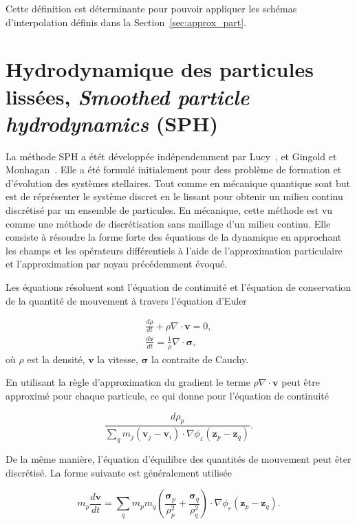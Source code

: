 Cette définition est déterminante pour pouvoir appliquer les schémas d'interpolation définis dans la Section~\ref{sec:approx_part}.

\section{Hydrodynamique des particules lissées, \textit{Smoothed particle hydrodynamics} (SPH)}

La méthode SPH a étét développée indépendemment par Lucy~\cite{lucy_1977}, et Gingold et Monhagan~\cite{gingold_monaghan_sph_1977}. Elle a été formulé initialement pour dess problème de formation et d'évolution des systèmes stellaires. Tout comme en mécanique quantique sont but est de réprésenter le système discret en le lissant pour obtenir un milieu continu discrétisé par un ensemble de particules. En mécanique, cette méthode est vu comme une méthode de discrétisation sans maillage d'un milieu continu.
Elle consiste à résoudre la forme forte des équations de la dynamique en approchant les champs et les opérateurs différentiels à l'aide de l'approximation particulaire et l'approximation par noyau précédemment évoqué.

Les équations résoluent sont l'équation de continuité et l'équation de conservation de la quantité de mouvement à travers l'équation d'Euler

\begin{eqnarray*}
    \frac{d\rho}{dt} + \rho \nabla \cdot \bm{v} = 0, \\
    \frac{d\bm v}{dt} = \frac1\rho \nabla \cdot \bm \sigma,
\end{eqnarray*}où $\rho$ est la densité, $\bm v$ la vitesse, $\bm \sigma$ la contraite de Cauchy.

En utilisant la règle d'approximation du gradient le terme $\rho \nabla \cdot \bm{v}$ peut être approximé pour chaque particule, ce qui donne pour l'équation de continuité

\begin{equation*}
    \frac{d\rho_p}{\sum_{q} m_j (\bm v_j - \bm v_i) \cdot \nabla \phi_\varepsilon(\bm z_p - \bm z_q)}.
\end{equation*}

De la même manière, l'équation d'équilibre des quantités de mouvement peut êter discrétisé. La forme suivante est généralement utilisée

\begin{equation*}
    m_p \frac{d \bm v}{dt} = \sum_{q} m_p m_q \left(\frac{\bm \sigma_p}{\rho_p^2} + \frac{\bm \sigma_q}{\rho_q^2} \right) \cdot \nabla \phi_\varepsilon(\bm z_p - \bm z_q).
\end{equation*}

